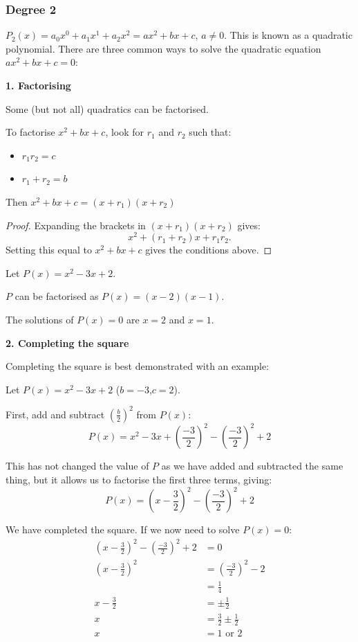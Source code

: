 \subsubsection{Degree 2} $P_2(x)=a_0x^0+a_1x^1+a_2x^2=ax^2 +bx +c$, $a\ne 0$. This is known as a quadratic polynomial. There are three common ways to solve the quadratic equation $ax^2 +bx + c=0$:

\textbf{1. Factorising}

Some (but not all) quadratics can be factorised.

To factorise $x^2+bx+c$, look for \(r_1\) and \(r_2\) such that:

\begin{itemize}
\item $r_1r_2=c$
\item $r_1+r_2=b$
\end{itemize}

Then $x^2+bx+c=(x+r_1)(x+r_2)$

\begin{proof}
Expanding the brackets in $(x+r_1)(x+r_2)$ gives:
$$x^2+(r_1+r_2)x+r_1r_2.$$
Setting this equal to $x^2+bx+c$ gives the conditions above.\footnotemark
\end{proof}

\begin{example}
Let $P(x)=x^2-3x +2$.

$P$ can be factorised as $P(x)=(x-2)(x-1)$.

The solutions of $P(x)=0$ are $x=2$ and $x=1$.

\end{example}

\textbf{2. Completing the square}

Completing the square is best demonstrated with an example:
\begin{example}
Let $P(x)=x^2-3x+2$ ($b=-3$,$c=2$).

First, add and subtract $\left(\frac{b}{2}\right)^2$ from $P(x)$:
$$P(x)=x^2-3x+\left(\frac{-3}{2}\right)^2-\left(\frac{-3}{2}\right)^2+2$$

This has not changed the value of $P$ as we have added and subtracted the same thing, but it allows us to factorise the first three terms, giving:
$$P(x)=\left(x-\frac{3}{2}\right)^2-\left(\frac{-3}{2}\right)^2+2$$

We have completed the square. If we now need to solve $P(x)=0$:
\begin{align}
\left(x-\frac{3}{2}\right)^2-\left(\frac{-3}{2}\right)^2+2&=0\\
\left(x-\frac{3}{2}\right)^2&=\left(\frac{-3}{2}\right)^2-2\\
&=\frac{1}{4}\\
x-\frac{3}{2}&=\pm \frac{1}{2}\\
x&=\frac{3}{2}\pm \frac{1}{2}\\
x&=1\text{ or }2
\end{align}
\end{example}

